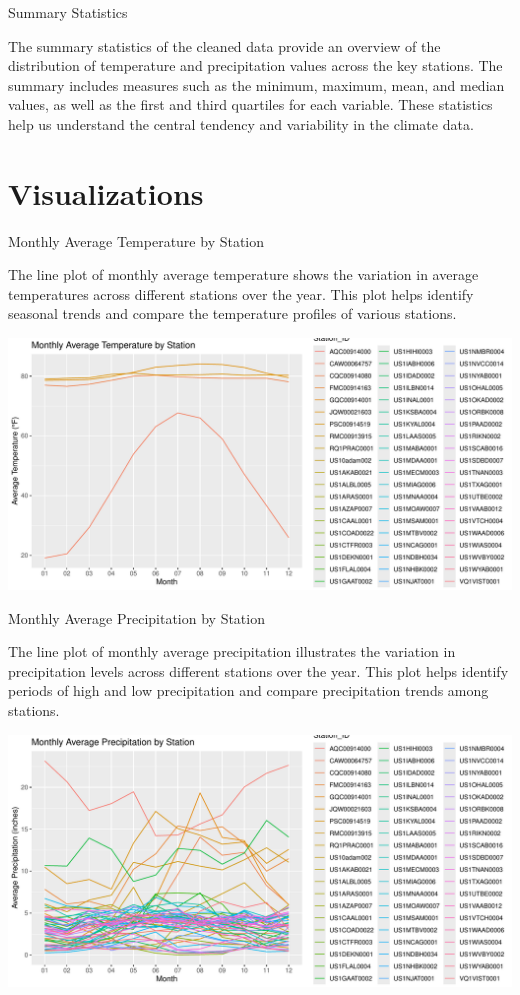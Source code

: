 \documentclass[
]{article}
\begin{document}
Summary Statistics

\justifying

The summary statistics of the cleaned data provide an overview of the
distribution of temperature and precipitation values across the key
stations. The summary includes measures such as the minimum, maximum,
mean, and median values, as well as the first and third quartiles for
each variable. These statistics help us understand the central tendency
and variability in the climate data.

\section*{Visualizations}

Monthly Average Temperature by Station

\justifying

The line plot of monthly average temperature shows the variation in
average temperatures across different stations over the year. This plot
helps identify seasonal trends and compare the temperature profiles of
various stations.

\includegraphics{climate_files/figure-latex/monthly_avg_temp-1.pdf}

Monthly Average Precipitation by Station

\justifying

The line plot of monthly average precipitation illustrates the variation
in precipitation levels across different stations over the year. This
plot helps identify periods of high and low precipitation and compare
precipitation trends among stations.

\includegraphics{climate_files/figure-latex/monthly_avg_precip-1.pdf}
\end{document}
